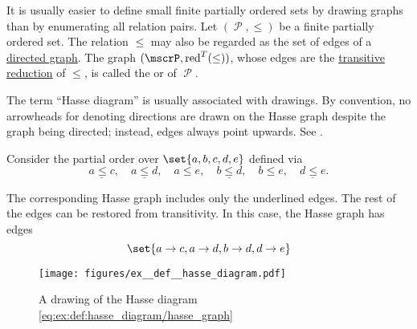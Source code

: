 \begin{definition}\label{def:hasse_diagram}
  It is usually easier to define small finite partially ordered sets by drawing graphs than by enumerating all relation pairs. Let \( (\mscrP, \leq) \) be a finite partially ordered set. The relation \( \leq \) may also be regarded as the set of edges of a \hyperref[def:graph/directed]{directed graph}. The graph \( (\mscrP, \red^T(\leq)) \), whose edges are the \hyperref[def:derived_relations/transitive]{transitive reduction} of \( \leq \), is called the  or  of \( \mscrP \).

  The term \enquote{Hasse diagram} is usually associated with drawings. By convention, no arrowheads for denoting directions are drawn on the Hasse graph despite the graph being directed; instead, edges always point upwards. See .
\end{definition}

\begin{example}\label{ex:def:hasse_diagram}
  Consider the partial order over \( \set{ a, b, c, d, e } \) defined via
  \begin{equation}\label{eq:ex:def:hasse_diagram/partially ordered set}
    \underline{a \leq c},\quad \underline{a \leq d},\quad a \leq e,\quad \underline{b \leq d},\quad b \leq e,\quad \underline{d \leq e}.
  \end{equation}

  The corresponding Hasse graph includes only the underlined edges. The rest of the edges can be restored from transitivity. In this case, the Hasse graph has edges
  \begin{equation}\label{eq:ex:def:hasse_diagram/hasse_graph}
    \set{ a \to c, a \to d, b \to d, d \to e }
  \end{equation}

  \begin{figure}
    \centering
    \texttt{[image: figures/ex\_\_def\_\_hasse\_diagram.pdf]}
    \caption{A drawing of the Hasse diagram \eqref{eq:ex:def:hasse_diagram/hasse_graph}}
    \label{fig:ex:def:hasse_diagram}
  \end{figure}
\end{example}

